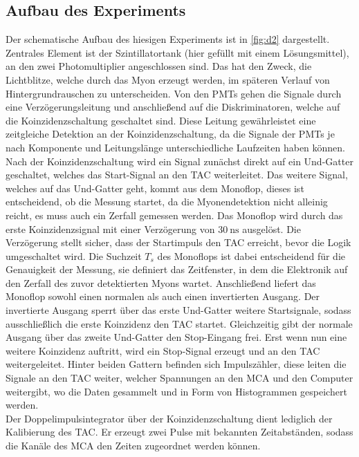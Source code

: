 \subsection{Aufbau des Experiments}
\label{sec:d2}
Der schematische Aufbau des hiesigen Experiments ist in \autoref{fig:d2}
dargestellt. Zentrales Element ist der Szintillatortank (hier gefüllt mit einem 
Lösungsmittel), an den zwei Photomultiplier angeschlossen sind. Das hat den 
Zweck, die Lichtblitze, welche durch das Myon erzeugt werden, im späteren Verlauf 
von Hintergrundrauschen zu unterscheiden. Von den PMTs gehen die Signale durch 
eine Verzögerungsleitung und anschließend auf die Diskriminatoren, welche 
auf die Koinzidenzschaltung geschaltet sind. Diese Leitung gewährleistet eine 
zeitgleiche Detektion an der Koinzidenzschaltung, da die Signale der PMTs je 
nach Komponente und Leitungslänge unterschiedliche Laufzeiten haben können.
Nach der Koinzidenzschaltung wird ein Signal zunächst direkt auf ein Und-Gatter 
geschaltet, welches das Start-Signal an den TAC weiterleitet. Das weitere 
Signal, welches auf das Und-Gatter geht, kommt aus dem Monoflop, dieses ist 
entscheidend, ob die Messung startet, da die Myonendetektion nicht alleinig 
reicht, es muss auch ein Zerfall gemessen werden. Das Monoflop wird durch das
erste Koinzidenzsignal mit einer Verzögerung von $\qty{30}{\nano\second}$
ausgelöst. Die Verzögerung stellt sicher, dass der Startimpuls den TAC 
erreicht, bevor die Logik umgeschaltet wird. Die Suchzeit $T_s$ des Monoflops 
ist dabei entscheidend für die Genauigkeit der Messung, sie definiert das
Zeitfenster, in dem die Elektronik auf den Zerfall des zuvor detektierten Myons
wartet. Anschließend liefert das Monoflop sowohl einen normalen als auch einen
invertierten Ausgang. Der invertierte Ausgang sperrt über das erste Und-Gatter
weitere Startsignale, sodass ausschließlich die erste Koinzidenz den TAC startet.
Gleichzeitig gibt der normale Ausgang über das zweite Und-Gatter den Stop-Eingang
frei. Erst wenn nun eine weitere Koinzidenz auftritt, wird ein Stop-Signal erzeugt
und an den TAC weitergeleitet. Hinter beiden Gattern befinden sich Impulszähler,
diese leiten die Signale an den TAC weiter, welcher Spannungen an den MCA und
den Computer weitergibt, wo die Daten gesammelt und in Form von Histogrammen 
gespeichert werden.
\vspace{0.5em} \\
\noindent Der Doppelimpulsintegrator über der Koinzidenzschaltung dient 
lediglich der Kalibierung des TAC. Er erzeugt zwei Pulse mit bekannten 
Zeitabständen, sodass die Kanäle des MCA den Zeiten zugeordnet werden können.
